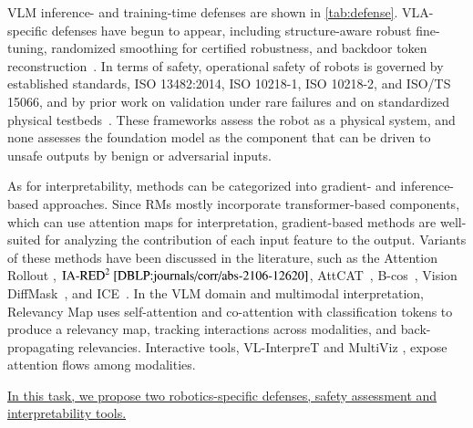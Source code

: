 \documentclass[11pt,letterpaper]{article}
\begin{document}
VLM inference- and training-time defenses are shown in \autoref{tab:defense}. VLA-specific defenses have begun to appear, including structure-aware robust fine-tuning, randomized smoothing for certified robustness, and backdoor token reconstruction~\cite{zhang2026structure,seferis2025randomized,li2026whenattention}. %
In terms of safety, operational safety of robots is governed by established standards, \eg ISO 13482:2014, ISO 10218-1, ISO 10218-2, and ISO/TS 15066, and by prior work on validation under rare failures and on standardized physical testbeds~\cite{FoschVillaronga2015CreationOA,RePEc:eps:cepswp:26204,10.3389/frobt.2022.1002226,fosch21,zhangei2023quadruped-tro,weng2023standard-legged-test,weng2023comparability}. These frameworks assess the robot as a physical system, and none assesses the foundation model as the component that can be driven to unsafe outputs by benign or adversarial inputs.

As for interpretability, methods can be categorized into gradient- and inference-based approaches. 
Since RMs mostly incorporate transformer-based components, which can use
attention maps for interpretation, gradient-based methods are well-suited for analyzing the contribution of each input feature to the output.
Variants of these methods have been discussed in the literature, such as the Attention Rollout \cite{abnar2020quantifying}, $\text{IA-RED}^2~\cite{DBLP:journals/corr/abs-2106-12620}$, AttCAT~\cite{DBLP:conf/nips/QiangPLLJZ22}, B-cos~\cite{DBLP:journals/corr/abs-2301-08669}, Vision DiffMask~\cite{DBLP:conf/cvpr/NalmpantisPGPA23}, and ICE~\cite{DBLP:conf/cvpr/ChoiJH23}. 
In the VLM domain and multimodal interpretation, Relevancy Map \cite{chefer2021generic} uses self-attention and co-attention with classification tokens to produce a relevancy map, tracking interactions across modalities, and back-propagating relevancies. 
Interactive tools, \eg VL-InterpreT \cite{aflalo2022vl} and MultiViz \cite{liang2022multiviz}, expose attention flows among modalities. %

\ul{In this task, we propose two robotics-specific defenses, safety assessment and interpretability tools.}
\end{document}
